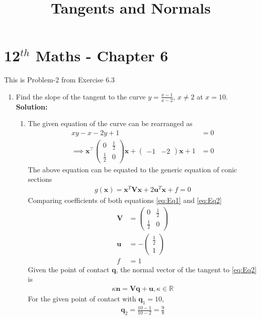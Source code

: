 \documentclass[12pt]{article}
\providecommand{\brak}[1]{\ensuremath{\left(#1\right)}}
\newcommand{\solution}{\noindent \textbf{Solution: }}
\newcommand{\myvec}[1]{\ensuremath{\begin{pmatrix}#1\end{pmatrix}}}
\let\vec\mathbf
\begin{document}
\begin{center}
\title{\textbf{Tangents and Normals}}
\date{\vspace{-5ex}} %
\maketitle
\end{center}
\setcounter{page}{1}

\section{12$^{th}$ Maths - Chapter 6}
This is Problem-2 from Exercise 6.3 
\begin{enumerate}
\item Find the slope of the tangent to the curve $y = \frac{x-1}{x-2}$, $x \neq 2$ at $x=10$.
\solution 
\begin{enumerate}
\item The given equation of the curve can be rearranged as
\begin{align}
	xy-x-2y+1 &= 0 \\
        \label{eq:Eq1}
	\implies \vec{x}^\top\myvec{0 & \frac{1}{2} \\ \frac{1}{2} & 0}\vec{x} + \myvec{-1 & -2}\vec{x}+1 &= 0 
\end{align}
The above equation can be equated to the generic equation of conic sections
\begin{align}
	\label{eq:Eq2}
	g\brak{\vec{x}} = \vec{x}^T\vec{V}\vec{x} + 2\vec{u}^T\vec{x} + f = 0 
\end{align}
Comparing coefficients of both equations \eqref{eq:Eq1} and \eqref{eq:Eq2} 
\begin{align}
	\vec{V} &= \myvec{ 0 & \frac{1}{2} \\ \frac{1}{2} & 0} \\
	\vec{u} &= -\myvec{\frac{1}{2} \\ 1} \\
	f &= 1 
\end{align}
Given the point of contact $\vec{q}$, the normal vector of the tangent to \eqref{eq:Eq2} is
\begin{align}
	\label{eq:Eq3}
        \kappa \vec{n} = \vec{V}\vec{q}+\vec{u}, \kappa \in \mathbb{R}
\end{align}
For the given point of contact with $\vec{q}_1=10$,
\begin{align}
	\vec{q}_2 = \frac{10-1}{10-2} = \frac{9}{8} \\

\end{align}
\end{enumerate}
\end{enumerate}
\end{document}
